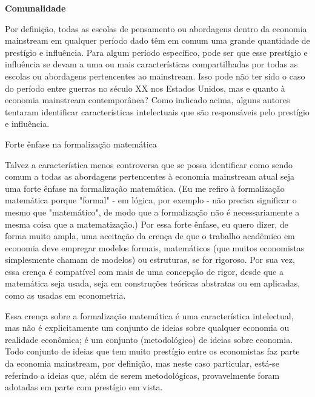 \documentclass[12pt]{article}
\begin{document}
\textbf{Comunalidade}

Por definição, todas as escolas de pensamento ou abordagens dentro da economia mainstream em qualquer período dado têm em comum uma grande quantidade de prestígio e influência. Para algum período específico, pode ser que esse prestígio e influência se devam a uma ou mais características compartilhadas por todas as escolas ou abordagens pertencentes ao mainstream. Isso pode não ter sido o caso do período entre guerras no século XX nos Estados Unidos, mas e quanto à economia mainstream contemporânea? Como indicado acima, alguns autores tentaram identificar características intelectuais que são responsáveis pelo prestígio e influência.

Forte ênfase na formalização matemática

Talvez a característica menos controversa que se possa identificar como sendo comum a todas as abordagens pertencentes à economia mainstream atual seja uma forte ênfase na formalização matemática. (Eu me refiro à formalização matemática porque "formal" - em lógica, por exemplo - não precisa significar o mesmo que "matemático", de modo que a formalização não é necessariamente a mesma coisa que a matematização.) Por essa forte ênfase, eu quero dizer, de forma muito ampla, uma aceitação da crença de que o trabalho acadêmico em economia deve empregar modelos formais, matemáticos (que muitos economistas simplesmente chamam de modelos) ou estruturas, se for rigoroso. Por sua vez, essa crença é compatível com mais de uma concepção de rigor, desde que a matemática seja usada, seja em construções teóricas abstratas ou em aplicadas, como as usadas em econometria.

Essa crença sobre a formalização matemática é uma característica intelectual, mas não é explicitamente um conjunto de ideias sobre qualquer economia ou realidade econômica; é um conjunto (metodológico) de ideias sobre economia. Todo conjunto de ideias que tem muito prestígio entre os economistas faz parte da economia mainstream, por definição, mas neste caso particular, está-se referindo a ideias que, além de serem metodológicas, provavelmente foram adotadas em parte com prestígio em vista.
\end{document}
